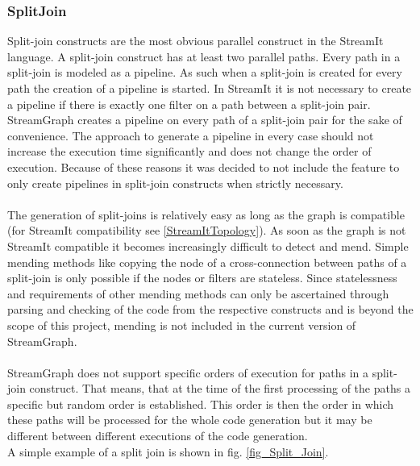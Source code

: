\documentclass[journal]{IEEEtran}
\begin{document}
\subsubsection{SplitJoin}
\noindent Split-join constructs are the most obvious parallel construct in the
StreamIt language. A split-join construct has at least two parallel paths. Every
path in a split-join is modeled as a pipeline. As such when a split-join is
created for every path the creation of a pipeline is started. In StreamIt it is
not necessary to create a pipeline if there is exactly one filter on a path
between a split-join pair. StreamGraph creates a pipeline on every path of a
split-join pair for the sake of convenience. The approach to generate a
pipeline in every case should not increase the execution time significantly and
does not change the order of execution. Because of these reasons it was decided
to not include the feature to only create pipelines in split-join constructs
when strictly necessary.\\
\\
The generation of split-joins is relatively easy as long as the graph is compatible
(for StreamIt compatibility see \ref{StreamItTopology}). As soon as the graph is not 
StreamIt compatible it becomes increasingly difficult to detect and mend. Simple 
mending methods like copying the node of a cross-connection between paths of a 
split-join is only possible if the nodes or filters are stateless. Since 
statelessness and requirements of other mending methods can only be ascertained 
through parsing and checking of the code from the respective constructs and is beyond 
the scope of this project, mending is not included in the current version of StreamGraph.\\
\\
StreamGraph does not support specific orders of execution for paths in a split-join 
construct. That means, that at the time of the first processing of the paths a specific
but random order is established. This order is then the order in which these paths will 
be processed for the whole code generation but it may be different between different
executions of the code generation.\\
A simple example of a split join is shown in fig. \ref{fig_Split_Join}.\\
\end{document}
